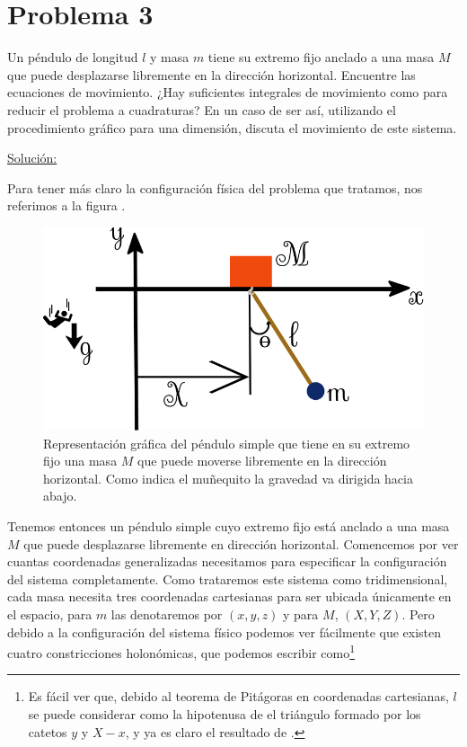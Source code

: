\documentclass[a4paper,10pt]{article}
\numberwithin{equation}{section}
\begin{document}
\section{Problema 3}

Un péndulo de longitud $l$ y masa $m$ tiene su extremo fijo anclado a una masa $M$ que 
puede desplazarse libremente en la dirección horizontal. Encuentre las ecuaciones de 
movimiento. ¿Hay suficientes integrales de movimiento como para reducir el problema 
a cuadraturas? En un caso de ser así, utilizando el procedimiento gráfico para una 
dimensión, discuta el movimiento de este sistema.

\vspace{.3cm}

\underline{Solución:} \vspace{.3cm}

Para tener más claro la configuración física del problema que tratamos, nos referimos 
a la figura .

\begin{figure}[H]
 \center
 \includegraphics[scale=0.4]{problema3fig1}
 \caption{Representación gráfica del péndulo simple que tiene en su extremo fijo 
 una masa $M$ que puede moverse libremente en la dirección horizontal. Como indica 
 el muñequito la gravedad va dirigida hacia abajo.}
 \label{fig:problema3fig1}
\end{figure}

Tenemos entonces un péndulo simple cuyo extremo fijo está anclado a una masa $M$ que 
puede desplazarse libremente en dirección horizontal. Comencemos por ver cuantas coordenadas
generalizadas necesitamos para especificar la configuración del sistema completamente. 
Como trataremos este sistema como tridimensional, cada masa necesita tres coordenadas 
cartesianas para ser ubicada únicamente en el espacio, para $m$ las denotaremos por 
$(x,y,z)$ y para $M$, $(X,Y,Z)$. Pero debido a la configuración del sistema físico 
podemos ver fácilmente que existen cuatro constricciones holonómicas, que podemos 
escribir como\footnote{Es fácil ver que, debido al teorema de Pitágoras en coordenadas
cartesianas, $l$ se puede considerar como la hipotenusa de el triángulo formado 
por los catetos $y$ y $X-x$, y ya es claro el resultado de .}
\end{document}
